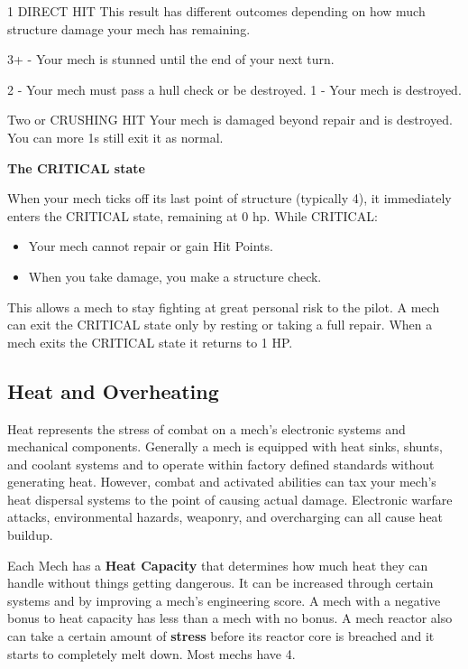  1               DIRECT HIT               This result has different outcomes depending on how much
                                          structure damage your mech has remaining.

                                          3+ - Your mech is stunned until the end of your next turn.

                                          2 - Your mech must pass a hull check or be destroyed.
                                          1 - Your mech is destroyed.

 Two or          CRUSHING HIT             Your mech is damaged beyond repair and is destroyed. You can
 more 1s                                  still exit it as normal.

 \begin{center}
   \textbf{The CRITICAL state}
 \end{center}

When your mech ticks off its last point of structure (typically 4), it immediately enters the CRITICAL state, remaining at 0 hp. While CRITICAL:
\begin{itemize}
\item Your mech cannot repair or gain Hit Points. 
\item When you take damage, you make a structure check.
\end{itemize}  
This allows a mech to stay fighting at great personal risk to the pilot. A mech can exit the CRITICAL state only by resting or taking a full repair. When a mech exits the CRITICAL state it returns to 1 HP.

\subsection{Heat and Overheating}

Heat represents the stress of combat on a mech’s electronic systems and mechanical components. Generally a mech is equipped with heat sinks, shunts, and coolant systems and to operate within factory defined standards without generating heat. However, combat and activated abilities can tax your mech’s heat dispersal systems to the point of causing actual damage. Electronic warfare attacks, environmental hazards, weaponry, and overcharging can all cause heat buildup. 

Each Mech has a \textbf{Heat Capacity} that determines how much heat they can handle without things getting dangerous. It can be increased through certain systems and by improving a mech’s engineering score. A mech with a negative bonus to heat capacity has less than a mech with no bonus. A mech reactor also can take a certain amount of \textbf{stress} before its reactor core is breached and it starts to completely melt down. Most mechs have 4. 

